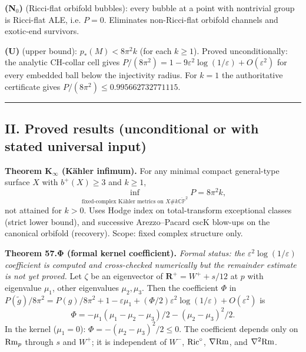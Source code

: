 \documentclass[
  10pt,
]{report}
\begin{document}
\textbf{(N\(_0\))} (Ricci-flat orbifold bubbles): every bubble at a
point with nontrivial group is Ricci-flat ALE, i.e. \(P=0\). Eliminates
non-Ricci-flat orbifold channels and exotic-end survivors.

\textbf{(U)} (upper bound): \(p_*(M)<8\pi^2k\) (for each \(k\ge1\)).
Proved unconditionally: the analytic CH-collar cell gives
\(P/(8\pi^2)=1-9\varepsilon^2\log(1/\varepsilon)+O(\varepsilon^2)\) for
every embedded ball below the injectivity radius. For \(k=1\) the
authoritative certificate gives \(P/(8\pi^2)\le0.995662732771115\).

\begin{center}\rule{0.5\linewidth}{0.5pt}\end{center}

\hypertarget{ii.-proved-results-unconditional-or-with-stated-universal-input}{%
\subsection{II. Proved results (unconditional or with stated universal
input)}\label{ii.-proved-results-unconditional-or-with-stated-universal-input}}

\textbf{Theorem K\(_\infty\) (Kähler infimum).} For any minimal compact
general-type surface \(X\) with \(b^+(X)\ge3\) and \(k\ge1\), \[
\inf_{\text{fixed-complex Kähler metrics on }X\#k\overline{\mathbb{CP}}^2} P = 8\pi^2k,
\] not attained for \(k>0\). Uses Hodge index on total-transform
exceptional classes (strict lower bound), and successive Arezzo--Pacard
cscK blow-ups on the canonical orbifold (recovery). Scope: fixed complex
structure only.

\textbf{Theorem 57.Φ (formal kernel coefficient).} \emph{Formal status:
the \(\varepsilon^2\log(1/\varepsilon)\) coefficient is computed and
cross-checked numerically but the remainder estimate is not yet proved.}
Let \(\zeta\) be an eigenvector of \(\mathbf R^+=W^++s/12\) at \(p\)
with eigenvalue \(\mu_1\), other eigenvalues \(\mu_2,\mu_3\). Then the
coefficient \(\Phi\) in
\(P(\tilde g)/8\pi^2=P(g)/8\pi^2+1-\varepsilon\mu_1+(\Phi/2)\varepsilon^2\log(1/\varepsilon)+O(\varepsilon^2)\)
is \[
\Phi=-\mu_1(\mu_1-\mu_2-\mu_3)/2-(\mu_2-\mu_3)^2/2.
\] In the kernel (\(\mu_1=0\)): \(\Phi=-(\mu_2-\mu_3)^2/2\le0\). The
coefficient depends only on \({\rm Rm}_p\) through \(s\) and \(W^+\); it
is independent of \(W^-\), \({\rm Ric}^\circ\), \(\nabla{\rm Rm}\), and
\(\nabla^2{\rm Rm}\).
\end{document}
